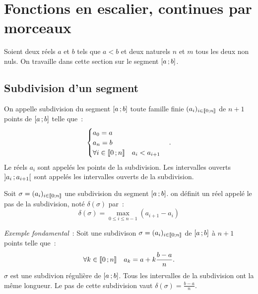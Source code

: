 \label{chap:integration}
\minitoc
\minilof
\minilot
%
\section{Fonctions en escalier, continues par morceaux}

Soient deux réels \(a\) et \(b\) tels que \(a<b\) et deux naturels \(n\) et \(m\) tous les deux non nuls. On travaille dans cette section sur le segment \(\left[ a \, ;  b \right]\).

\subsection{Subdivision d'un segment}

\begin{defdef}
  On appelle subdivision du segment \(\left[ a \, ;  b \right]\) toute famille finie \((a_i)_{i \in \mathopen{\llbracket}0\mathclose{}\mathpunct{};n\mathclose{\rrbracket}}\) de \(n+1\) points de \(\left[ a \, ;  b \right]\) telle que~:
  \begin{equation}
    \begin{cases}
      a_0=a \\
      a_n=b \\
      \forall i \in \mathopen{\llbracket}0\mathclose{}\mathpunct{};n\mathclose{\rrbracket} \quad a_i<a_{i+1}
    \end{cases}.
  \end{equation}
  Le réels \(a_i\) sont appelés les points de la subdivision. Les intervalles ouverts \(\left] a_i \, ;  a_{i+1} \right[\) sont appelés les intervalles ouverts de la subdivision.
\end{defdef}

\begin{defdef}
  Soit \(\sigma=(a_i)_{i \in \mathopen{\llbracket}0\mathclose{}\mathpunct{};n\mathclose{\rrbracket}}\) une subdivision du segment \(\left[ a \, ;  b \right]\). on définit un réel appelé le pas de la subdivision, noté \(\delta(\sigma)\) par~:
  \begin{equation}
    \delta(\sigma)=\max_{0 \leqslant i \leqslant n-1}(a_{i+1}-a_i)
  \end{equation}
\end{defdef}

\emph{Exemple fondamental}~: Soit une subdivison \(\sigma=(a_i)_{i \in \mathopen{\llbracket}0\mathclose{}\mathpunct{};n\mathclose{\rrbracket}}\) de \(\left[ a \, ;  b \right]\) à \(n+1\) points telle que~:
\begin{equation}
  \forall k \in \mathopen{\llbracket}0\mathclose{}\mathpunct{};n\mathclose{\rrbracket} \quad a_k=a+k \frac{b-a}{n}.
\end{equation}
\(\sigma\) est une subdivion régulière de \(\left[ a \, ;  b \right]\). Tous les intervalles de la subdivision ont la même longueur. Le pas de cette subdivision vaut \(\delta(\sigma)=\frac{b-a}{n}\).

